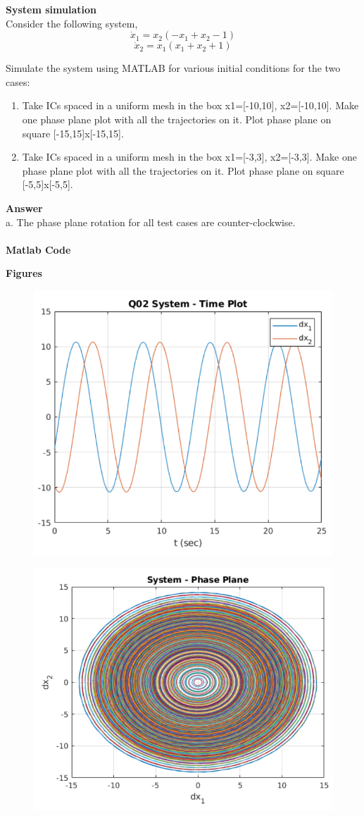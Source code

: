 \documentclass{homeworg}
\begin{document}
\exercise
\noindent
\textbf{System simulation} \\
Consider the following system,\\
\begin{equation*}
\dot{x}_1 = x_2 (-x_1 + x_2 -1)
\end{equation*}
\begin{equation*}
\dot{x}_2 = x_1 (x_1 + x_2 + 1)
\end{equation*}

\noindent
Simulate the system using MATLAB for various initial conditions for the two cases:
\begin{enumerate}[label=(\alph*)]
  \item Take ICs spaced in a uniform mesh in the box x1=[-10,10], x2=[-10,10]. Make one phase
  plane plot with all the trajectories on it. Plot phase plane on square [-15,15]x[-15,15].
  \item Take ICs spaced in a uniform mesh in the box x1=[-3,3], x2=[-3,3]. Make one phase
  plane plot with all the trajectories on it. Plot phase plane on square [-5,5]x[-5,5].
\end{enumerate}

\noindent
\textbf{Answer} \\
\noindent
a. The phase plane rotation for all test cases are counter-clockwise. \\ \\
\textbf{Matlab Code}

\newpage
\noindent
\textbf{Figures}\\
\begin{figure}[h]
  \includegraphics[width=.6\textwidth]{fig003.png}
  \centering
\end{figure}
\begin{figure}[h]
  \includegraphics[width=.6\textwidth]{fig004.png}
  \centering
\end{figure}
\end{document}
